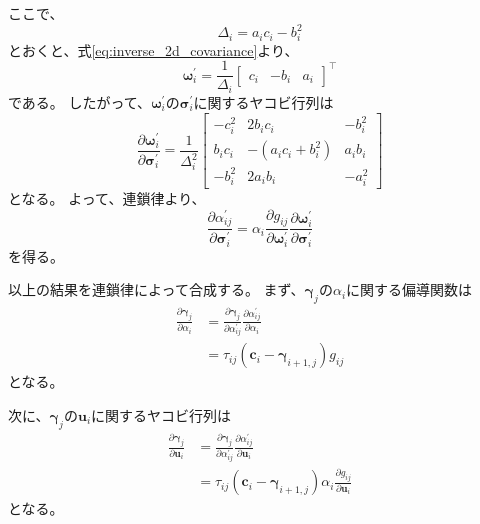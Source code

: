 \documentclass[dvipdfmx]{jlreq}
\begin{document}
ここで、
\begin{equation}
    \Delta_i=a_ic_i-b_i^2
    \label{eq:screen_covariance_determinant}
\end{equation}
とおくと、式\eqref{eq:inverse_2d_covariance}より、
\begin{equation}
    \bm{\omega}_i^{\prime} = \frac{1}{\Delta_i} \begin{bmatrix} c_i & -b_i & a_i \end{bmatrix}^{\top}
    \label{eq:inverse_covariance_vector}
\end{equation}
である。
したがって、$\bm{\omega}_i^{\prime}$の$\bm{\sigma}_i^{\prime}$に関するヤコビ行列は
\begin{equation}
    \frac{\partial\bm{\omega}_i^{\prime}}{\partial\bm{\sigma}_i^{\prime}} =
    \frac{1}{\Delta_i^2}
    \begin{bmatrix}
        -c_i^2 & 2b_ic_i & -b_i^2\\
        b_ic_i & -(a_ic_i+b_i^2) & a_ib_i\\
        -b_i^2 & 2a_ib_i & -a_i^2
    \end{bmatrix}
    \label{eq:inverse_covariance_jacobian}
\end{equation}
となる。
よって、連鎖律より、
\begin{equation}
    \frac{\partial\alpha_{ij}^{\prime}}{\partial\bm{\sigma}_i^{\prime}} = \alpha_i \frac{\partial g_{ij}}{\partial\bm{\omega}_i^{\prime}} \frac{\partial\bm{\omega}_i^{\prime}}{\partial\bm{\sigma}_i^{\prime}}
    \label{eq:screen_opacity_covariance_jacobian}
\end{equation}
を得る。

以上の結果を連鎖律によって合成する。
まず、$\bm{\gamma}_j$の$\alpha_i$に関する偏導関数は
\begin{equation}
    \begin{aligned}
        \frac{\partial\bm{\gamma}_j}{\partial\alpha_i}
        &=
        \frac{\partial\bm{\gamma}_j}{\partial\alpha_{ij}^{\prime}} \frac{\partial\alpha_{ij}^{\prime}}{\partial\alpha_i}\\
        &=
        \tau_{ij} \left(\bm{c}_i-\bm{\gamma}_{i+1,j}\right) g_{ij}
    \end{aligned}
    \label{eq:pixel_color_opacity_parameter_jacobian}
\end{equation}
となる。

次に、$\bm{\gamma}_j$の$\bm{u}_i$に関するヤコビ行列は
\begin{equation}
    \begin{aligned}
        \frac{\partial\bm{\gamma}_j}{\partial\bm{u}_i} &=
        \frac{\partial\bm{\gamma}_j}{\partial\alpha_{ij}^{\prime}} \frac{\partial\alpha_{ij}^{\prime}}{\partial\bm{u}_i}\\
        &= \tau_{ij} \left(\bm{c}_i-\bm{\gamma}_{i+1,j}\right) \alpha_i \frac{\partial g_{ij}}{\partial\bm{u}_i}
    \end{aligned}
    \label{eq:pixel_color_position_jacobian}
\end{equation}
となる。
\end{document}
